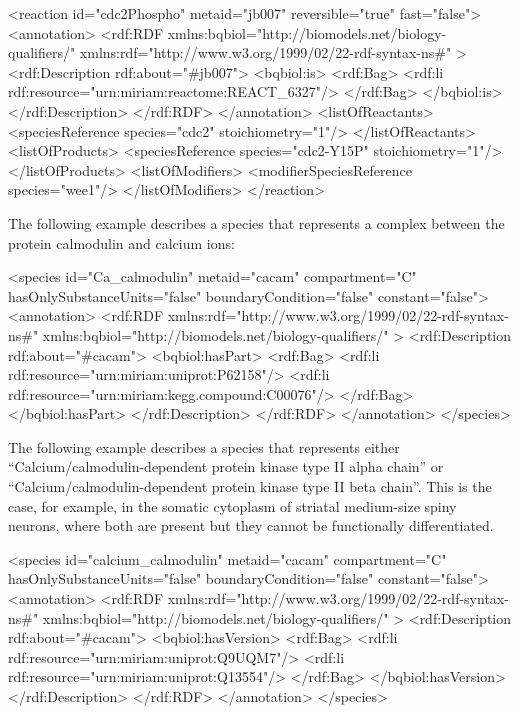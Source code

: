 \begin{example}
<reaction id="cdc2Phospho" metaid="jb007" reversible="true" fast="false">
  <annotation>
    <rdf:RDF
      xmlns:bqbiol="http://biomodels.net/biology-qualifiers/"
      xmlns:rdf="http://www.w3.org/1999/02/22-rdf-syntax-ns\#"
    >
      <rdf:Description rdf:about="#jb007">
        <bqbiol:is>
          <rdf:Bag>
            <rdf:li rdf:resource="urn:miriam:reactome:REACT_6327"/>
          </rdf:Bag>
        </bqbiol:is>
      </rdf:Description>
    </rdf:RDF>
  </annotation>
  <listOfReactants>
    <speciesReference species="cdc2" stoichiometry="1"/>
  </listOfReactants>
  <listOfProducts>
    <speciesReference species="cdc2-Y15P" stoichiometry="1"/>
  </listOfProducts>
  <listOfModifiers>
    <modifierSpeciesReference species="wee1"/>
  </listOfModifiers>
</reaction>
\end{example}

The following example describes a species that represents a
complex between the protein calmodulin and calcium ions:

\begin{example}
<species id="Ca_calmodulin" metaid="cacam" compartment="C"
         hasOnlySubstanceUnits="false" boundaryCondition="false"
         constant="false">
  <annotation>
    <rdf:RDF
      xmlns:rdf="http://www.w3.org/1999/02/22-rdf-syntax-ns\#"
      xmlns:bqbiol="http://biomodels.net/biology-qualifiers/"
    >
      <rdf:Description rdf:about="\#cacam">
        <bqbiol:hasPart>
          <rdf:Bag>
            <rdf:li rdf:resource="urn:miriam:uniprot:P62158"/>
            <rdf:li rdf:resource="urn:miriam:kegg.compound:C00076"/>
          </rdf:Bag>
        </bqbiol:hasPart>
      </rdf:Description>
    </rdf:RDF>
  </annotation>
</species>
\end{example}

The following example describes a species that represents either
``Calcium/calmodulin-dependent protein kinase type II alpha
chain'' or ``Calcium/calmodulin-dependent protein kinase type II
beta chain''. This is the case, for example, in the somatic
cytoplasm of striatal medium-size spiny neurons, where both are
present but they cannot be functionally differentiated.


\begin{example}
<species id="calcium_calmodulin" metaid="cacam" compartment="C"
         hasOnlySubstanceUnits="false" boundaryCondition="false"
         constant="false">
  <annotation>
    <rdf:RDF
      xmlns:rdf="http://www.w3.org/1999/02/22-rdf-syntax-ns\#"
      xmlns:bqbiol="http://biomodels.net/biology-qualifiers/"
    >
      <rdf:Description rdf:about="\#cacam">
        <bqbiol:hasVersion>
          <rdf:Bag>
            <rdf:li rdf:resource="urn:miriam:uniprot:Q9UQM7"/>
            <rdf:li rdf:resource="urn:miriam:uniprot:Q13554"/>
          </rdf:Bag>
        </bqbiol:hasVersion>
      </rdf:Description>
    </rdf:RDF>
  </annotation>
</species>
\end{example}



